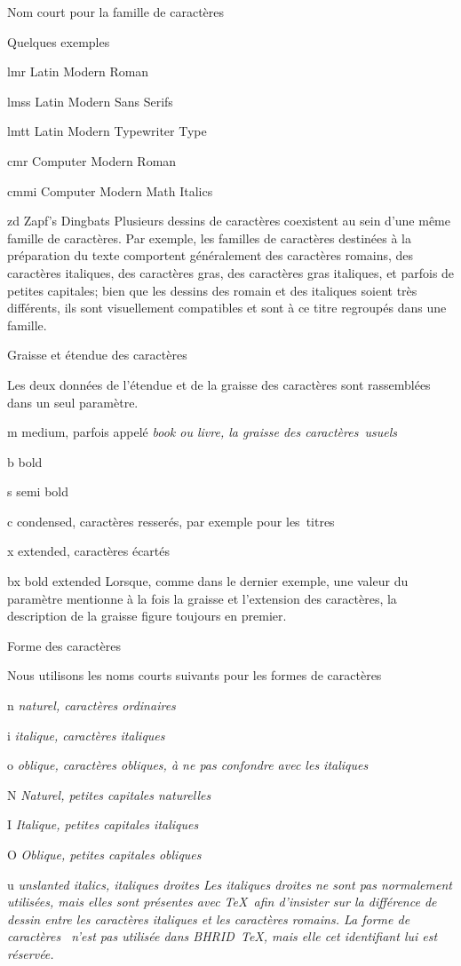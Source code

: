 \formalpar Nom court pour la famille de caractères

Quelques exemples
\beginlist\tag
\item{lmr}	Latin Modern Roman
\item{lmss}	Latin Modern Sans Serifs
\item{lmtt}	Latin Modern Typewriter Type
\item{cmr}	Computer Modern Roman
\item{cmmi}	Computer Modern Math Italics
\item{zd}	Zapf's Dingbats
\endlist
Plusieurs dessins de caractères coexistent au sein d'une même famille
de caractères. Par exemple, les familles de caractères destinées à la
préparation du texte comportent généralement des caractères romains,
des caractères italiques, des caractères gras, des caractères gras
italiques, et parfois de petites capitales; bien que les dessins des
romain et des italiques soient très différents, ils sont visuellement
compatibles et sont à ce titre regroupés dans une famille.

\formalpar Graisse et étendue des caractères

Les deux données de l'étendue et de la graisse des caractères sont
rassemblées dans un seul paramètre.
\beginlist\tag
\item{m}	medium, parfois appelé \em{book} ou livre, la graisse
		des caractères~usuels
\item{b}	bold
\item{s}	semi bold
\smallskip
\item{c}	condensed, caractères resserés, par exemple pour les~titres
\item{x}	extended, caractères écartés
\smallskip
\item{bx}	bold extended
\endlist
Lorsque, comme dans le dernier exemple, une valeur du paramètre
mentionne à la fois la graisse et l'extension des caractères, la
description de la graisse figure toujours en premier.

\formalpar Forme des caractères

Nous utilisons les noms courts suivants pour les formes de caractères
\beginlist\tag
\item{n}	\em{naturel}, caractères ordinaires
\item{i}	\em{italique}, caractères italiques
\item{o}	\em{oblique}, caractères obliques,
		à ne pas confondre avec les italiques
\item{N}	\em{Naturel}, petites capitales naturelles
\item{I}	\em{Italique}, petites capitales italiques
\item{O}	\em{Oblique}, petites capitales obliques
\smallskip
\item{u}	\em{unslanted italics}, italiques droites
\endlist
Les italiques droites ne sont pas normalement utilisées, mais elles
sont présentes avec \TeX\ afin d'insister sur la différence de dessin
entre les caractères italiques et les caractères romains. La forme de
caractères~ n'est pas utilisée dans BHRID~\TeX, mais elle cet
identifiant lui est réservée.


